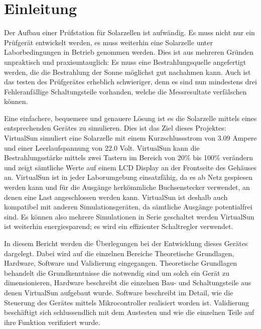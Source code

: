 \documentclass[a4paper]{fhnwreport} %
\begin{document}
\section{Einleitung}

Der Aufbau einer Prüfstation für Solarzellen ist aufwändig. Es muss nicht nur ein Prüfgerät entwickelt werden, es muss weiterhin eine Solarzelle unter Laborbedingungen in Betrieb genommen werden. Dies ist aus mehreren Gründen unpraktisch und praxisuntauglich: Es muss eine Bestrahlungsquelle angefertigt werden, die die Bestrahlung der Sonne möglichst gut nachahmen kann. Auch ist das testen des Prüfgerätes erheblich schwieriger, denn es sind nun mindestens drei Fehleranfällige Schaltungsteile vorhanden, welche die Messresultate verfälschen können. 

Eine einfachere, bequemere und genauere Lösung ist es die Solarzelle mittels eines entsprechenden Gerätes zu simulieren. Dies ist das Ziel dieses Projektes: VirtualSun simuliert eine Solarzelle mit einem Kurzschlussstrom von 3.09 Ampere und einer Leerlaufspannung von 22.0 Volt. VirtualSun kann die Bestrahlungsstärke mittels zwei Tastern im Bereich von 20\% bis 100\% verändern und zeigt sämtliche Werte auf einem LCD Display an der Frontseite des Gehäuses an. VirtualSun ist in jeder Laborumgebung einsatzfähig, da es ab Netz gespiesen werden kann und für die Ausgänge herkömmliche Buchsenstecker verwendet, an denen eine Last angeschlossen werden kann. VirtualSun ist deshalb auch kompatibel mit anderen Simulationsgeräten, da sämtliche Ausgänge potentialfrei sind. Es können also mehrere Simulationen in Serie geschaltet werden  VirtualSun ist weiterhin energiesparend; es wird ein effizienter Schaltregler verwendet. 

In diesem Bericht werden die Überlegungen bei der Entwicklung dieses Gerätes dargelegt. Dabei wird auf die einzelnen Bereiche Theoretische Grundlagen, Hardware, Software und Validierung eingegangen. Theoretische Grundlagen behandelt die Grundkenntnisse die notwendig sind um solch ein Gerät zu dimensionieren, Hardware  beschreibt die einzelnen Bau- und Schaltungsteile aus denen VirtualSun aufgebaut wurde. Software beschreibt im Detail, wie die Steuerung des Gerätes mittels Mikrocontroller realisiert worden ist. Validierung beschäftigt sich schlussendlich mit dem Austesten und wie die einzelnen Teile auf ihre Funktion verifiziert wurde.
\newpage
%
%
\end{document}
